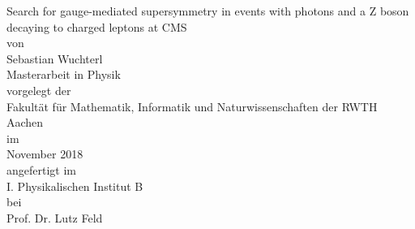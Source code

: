 \vspace{1.5cm}
\begin{center}
 \Huge
 Search for gauge-mediated supersymmetry in events with photons and a Z boson decaying to charged leptons at CMS
 \\
 \vspace{1.5cm}
 \normalsize
 von\\
 \LARGE
 Sebastian Wuchterl\\
 \vspace{1.0cm}
 \Large
 Masterarbeit in Physik\\
 \vspace{1.5cm}
 \normalsize
 vorgelegt der \\
 \Large
 Fakult\"at f\"ur Mathematik, Informatik und Naturwissenschaften der RWTH Aachen\\
 \vspace{1.5cm}
 \normalsize
 im\\
 \Large
 November 2018\\
 \vspace{1.5cm}
 \normalsize
 angefertigt im\\
 \Large
 I. Physikalischen Institut B\\
 \vspace{1.5cm}
 \normalsize
 bei\\
 \Large
 Prof. Dr. Lutz Feld
\end{center}
\thispagestyle{empty}
\restoregeometry
\newpage
